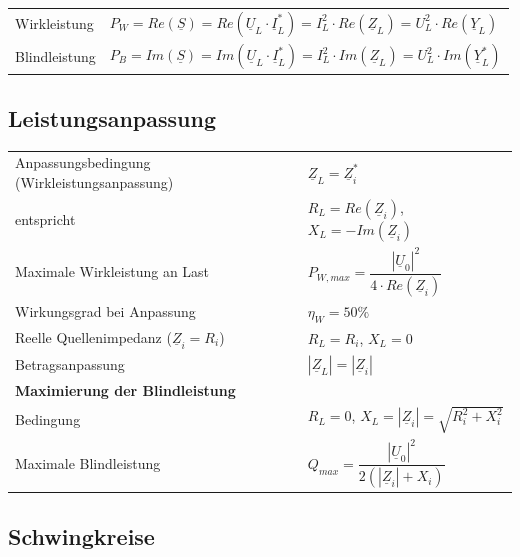 \documentclass[a4paper,12pt]{scrartcl}
\begin{document}
\begin{tabular}{@{} l l @{}}
\hspace*{20mm} Wirkleistung & $P_W = Re(\underline{S}) = Re(\underline{U}_L\cdot\underline{I}_L^*) = I_L^2\cdot Re(\underline{Z}_L) = U_L^2\cdot Re(\underline{Y}_L)$ \\
\hspace*{20mm} Blindleistung & $P_B = Im(\underline{S}) = Im(\underline{U}_L\cdot\underline{I}_L^*) = I_L^2\cdot Im(\underline{Z}_L) = U_L^2\cdot Im(\underline{Y}_L^*)$ \\
\end{tabular}

\subsection{Leistungsanpassung}
\begin{tabular}{@{} l l @{}}
\hspace*{20mm} Anpassungsbedingung (Wirkleistungsanpassung) & $\underline{Z}_L = \underline{Z}_i^*$ \\
\hspace*{20mm} \quad entspricht & $R_L = Re(\underline{Z}_i)$, \quad $X_L = -Im(\underline{Z}_i)$ \\
\hspace*{20mm} Maximale Wirkleistung an Last & $P_{W,max} = \dfrac{|\underline{U}_0|^2}{4\cdot Re(\underline{Z}_i)}$ \\
\hspace*{20mm} Wirkungsgrad bei Anpassung & $\eta_W = 50\%$ \\
\hspace*{20mm} Reelle Quellenimpedanz ($\underline{Z}_i = R_i$) & $R_L = R_i$, \quad $X_L = 0$ \\
\hspace*{20mm} Betragsanpassung & $|\underline{Z}_L| = |\underline{Z}_i|$ \\[3mm]
\multicolumn{2}{l}{\textbf{Maximierung der Blindleistung}} \\
\hspace*{20mm} Bedingung & $R_L = 0$, \quad $X_L = |\underline{Z}_i| = \sqrt{R_i^2 + X_i^2}$ \\
\hspace*{20mm} Maximale Blindleistung & $Q_{max} = \dfrac{|\underline{U}_0|^2}{2\!\left(|\underline{Z}_i| + X_i\right)}$ \\
\end{tabular}

\subsection{Schwingkreise}
\end{document}
